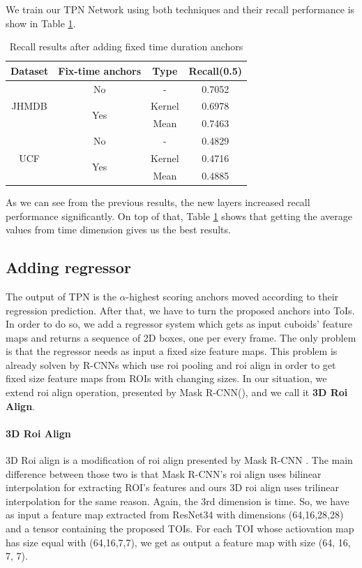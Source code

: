 We train our TPN Network using both techniques and their recall performance is show in Table \ref{table:add_16}.

\begin{table}[h]
  \centering
  \begin{tabular}{||c | c | c || c ||}
    \hline
    \textbf{Dataset} & \textbf{Fix-time anchors} & \textbf{Type} & \textbf{Recall(0.5)} \\
    \hline  \hline
    \multirow{3}{4em}{JHMDB} & No &  - & 0.7052 \\
    \cline{2-4}
    {} & \multirow{2}{*}{Yes} & Kernel & 0.6978 \\
    \cline{3-4}
    {} & {} & Mean & 0.7463 \\
    \hline
    \multirow{3}{4em}{UCF} & No & - & 0.4829 \\
    \cline{2-4}
    {} & \multirow{2}{*}{Yes} & Kernel & 0.4716 \\
    \cline{3-4}
    {} & {} & Mean & 0.4885 \\
    \hline      
  \end{tabular}
  \caption{Recall results after adding fixed time duration anchors}
  \label{table:add_16}
\end{table}

As we can see from the previous results, the new layers increased recall performance significantly. On top of that, Table \ref{table:add_16} shows that
getting the average values from time dimension gives us the best results.


\subsection{Adding regressor}
The output of TPN is the $\alpha$-highest scoring anchors moved according to their regression prediction. After that, we have to turn the proposed anchors into ToIs.
In order to do so, we add a regressor system which gets as input cuboids' feature maps and returns a sequence of 2D boxes, one per every frame.
The only problem is that the regressor needs as input a fixed size feature maps. This problem is already solven by R-CNNs which use roi pooling and roi align
in order to get fixed size feature maps from ROIs with changing sizes. In our situation, we extend roi align operation, presented by Mask R-CNN(\cite{DBLP:journals/corr/HeGDG17}),
and we
call it \textbf{3D Roi Align}.

\paragraph{3D Roi Align}
3D Roi align is a modification of roi align presented by Mask R-CNN . The main difference between those two is that Mask R-CNN's roi align uses
bilinear interpolation for extracting ROI's features and ours 3D roi align uses trilinear interpolation for the same reason. Again, the 3rd dimension is
time.
So, we have as input a feature map extracted from ResNet34 with dimensions (64,16,28,28) and a tensor containing the proposed TOIs.
For each TOI whose actiovation map has size equal with (64,16,7,7), we get as output a feature map with size (64, 16, 7, 7). \par

